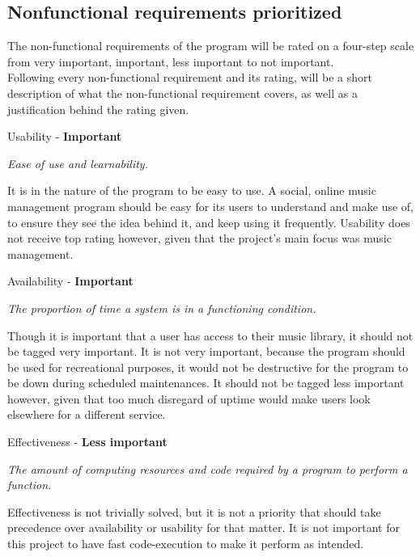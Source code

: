 \subsection{Nonfunctional requirements prioritized}


The non-functional requirements of the program will be rated on a four-step scale from very
important, important, less important to not important.
\\
Following every non-functional requirement and its rating, will be a short description of
what the non-functional requirement covers, as well as a justification behind the rating
given.
\newpage

\noindent
Usability - \textbf{Important}

\vspace{5 mm}
\noindent
\textit{Ease of use and learnability.}

\vspace{5 mm}

\noindent
It is in the nature of the program to be easy to use. A social, online music management
program should be easy for its users to understand and make use of, to ensure they see the
idea behind it, and keep using it frequently. Usability does not receive top rating
however, given that the project's main focus was music management.

\vspace{5 mm}
\noindent
Availability - \textbf{Important}

\vspace{5 mm}
\noindent
\textit{The proportion of time a system is in a functioning condition.}

\vspace{5 mm}
\noindent
Though it is important that a user has access to their music library, it should not be
tagged very important. It is not very important, because the program should be used for
recreational purposes, it would not be destructive for the program to be down during
scheduled maintenances. It should not be tagged less important however, given that too much
disregard of uptime would make users look elsewhere for a different service.

\vspace{5 mm}
\noindent
Effectiveness - \textbf{Less important}

\vspace{5 mm}
\noindent
\textit{The amount of computing resources and code required by a program to perform a
function.}

\vspace{5 mm}
\noindent
Effectiveness is not trivially solved, but it is not a priority that should take precedence
over availability or usability for that matter. It is not important for this project to
have fast code-execution to make it perform as intended.

